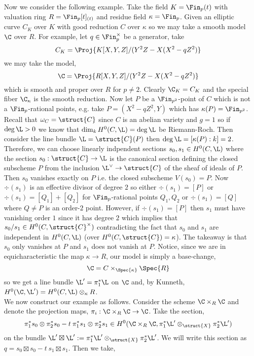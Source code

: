 Now we consider the following example. Take the field $K = \Fin_p(t)$ with valuation ring $R = \Fin_p[t]_{(t)}$ and residue field $\kappa = \Fin_p$. Given an elliptic curve $C_K$ over $K$ with good reduction $C$ over $\kappa$ so we may take a smooth model $\C$ over $R$. For example, let $q \in \Fin_p^\times$ be a generator, take 
\[ C_K = \Proj{K[X, Y, Z]/(Y^2 Z - X(X^2 - q Z^2)} \] 
we may take the model,
\[ \C = \Proj{R[X, Y, Z]/(Y^2 Z - X(X^2 - q Z^2)} \] 
which is smooth and proper over $R$ for $p \neq 2$. Clearly $\C_K = C_K$ and the special fiber $\C_\kappa$ is the smooth reduction. Now let $P$ be a $\Fin_{p^2}$-point of $C$ which is not a $\Fin_p$-rational points, e.g. take $P = (X^2 - q Z^2, Y)$ which has $\kappa(P) = \Fin_{p^2}$. Recall that $\omega_C = \struct{C}$ since $C$ is an abelian variety and $g = 1$ so if $\deg{\L} > 0$ we know that $\dim_k H^0(C, \L) = \deg{\L}$ be Riemann-Roch. Then consider the line bundle $\L = \struct{C}(P)$ then $\deg{\L} = [\kappa(P) : k]  = 2$. Therefore, we can choose linearly indpendent sections $s_0, s_1 \in H^0(C, \L)$ where the section $s_0 : \struct{C} \to \L$ is the canonical section defining the closed subscheme $P$ from the inclusion $\L^\vee \to \struct{C}$ of the sheaf of ideals of $P$. Then $s_0$ vanishes exactly on $P$ i.e. the closed subscheme $V(s_0) = P$. Now $\div{(s_1)}$ is an effective divisor of degree $2$ so either $\div{(s_1)} = [P]$ or $\div{(s_1)} = [Q_1] + [Q_2]$ for $\Fin_p$-rational points $Q_1, Q_2$ or $\div{(s_1)} = [Q]$ where $Q \neq P$ is an order-$2$ point. However, if $\div{(s_1)} = [P]$ then $s_1$ must have vanishing order $1$ since it has degree $2$ which implies that $s_0 / s_1 \in H^0(C, \struct{C}^\times)$ contradicting the fact that $s_0$ and $s_1$ are independent in $H^0(C, \L)$ (over $H^0(C, \struct{C}) = \kappa$). The takeaway is that $s_0$ only vanishes at $P$ and $s_1$ does not vanish at $P$. Notice, since we are in equicharacteristic the map $\kappa \to R$, our model is simply a base-change,
\[ \C = C \times_{\Spec{\kappa}} \Spec{R} \]
so we get a line bundle $\L' = \pi_1^* \L$ on $\C$ and, by Kunneth, $H^0(\C, \L') = H^0(C, \L) \otimes_\kappa R$.   
\bigskip\\
We now construct our example as follows. Consider the scheme $\C \times_R \C$ and denote the projection maps, $\pi_i : \C \times_R \C \to \C$. Take the section,
\[ \pi_1^* s_0 \otimes \pi_2^* s_0 - t \: \pi_1^* s_1 \otimes \pi_2^* s_1 \in H^0(\C \times_R \C, \pi_1^* \L' \otimes_{\struct{X}} \pi_2^* \L') \]
on the bundle $\L' \boxtimes \L' := \pi_1^* \L' \otimes_{\struct{X}} \pi_2^* \L'$. We will write this section as $q = s_0 \boxtimes s_0 - t \: s_1 \boxtimes s_1$. Then we take,
